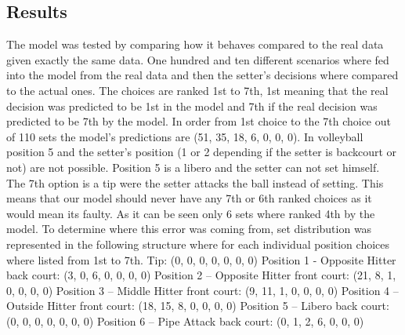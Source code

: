\documentclass[main.tex]{subfiles}
\begin{document}
    \subsection{Results}
      The model was tested by comparing how it behaves compared to the real data given exactly the same data. One hundred and ten different scenarios where fed into the model from the real data and then the setter’s decisions where compared to the actual ones. The choices are ranked 1st to 7th, 1st meaning that the real decision was predicted to be 1st in the model and 7th if the real decision was predicted to be 7th by the model. In order from 1st choice to the 7th choice out of 110 sets the model’s predictions are (51, 35, 18, 6, 0, 0, 0). In volleyball position 5 and the setter’s position (1 or 2 depending if the setter is backcourt or not) are not possible. Position 5 is a libero and the setter can not set himself. The 7th option is a tip were the setter attacks the ball instead of setting. This means that our model should never have any 7th or 6th ranked choices as it would mean its faulty. As it can be seen only 6 sets where ranked 4th by the model. To determine where this error was coming from, set distribution was represented in the following structure where for each individual position choices where listed from 1st to 7th.
Tip: (0, 0, 0, 0, 0, 0, 0)
Position 1 - Opposite Hitter back court: (3, 0, 6, 0, 0, 0, 0)
Position 2 – Opposite Hitter front court: (21, 8, 1, 0, 0, 0, 0)
Position 3 – Middle Hitter front court: (9, 11, 1, 0, 0, 0, 0)
Position 4 – Outside Hitter front court: (18, 15, 8, 0, 0, 0, 0)
Position 5 – Libero back court: (0, 0, 0, 0, 0, 0, 0)
Position 6 – Pipe Attack back court: (0, 1, 2, 6, 0, 0, 0)
\end{document}
